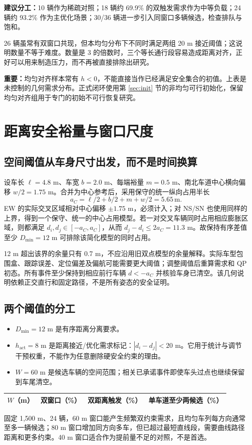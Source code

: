 \documentclass[UTF8,fontset=fandol,11pt,a4paper]{ctexart}
\newcommand{\unit}[1]{\,\mathrm{#1}}\newcommand{\nom}{\mathrm{nom}}
\newcommand{\page}[1]{\clearpage\section{#1}}
\begin{document}
\textbf{建议分工：}10 辆作为稀疏对照；18 辆约 69.9\% 的双触发需求作为中等负载；24 辆约 93.2\% 作为主优化场景；30/36 辆进一步引入同窗口多辆候选，检查排队与饱和。

26 辆虽常有双窗口共现，但本均匀分布下不同时满足两组 20 m 接近阈值；这说明数量不等于难度。数量是 3 的倍数时，三个等长通行段容易造成距离对齐，正好可以用来制造压力，而不再被直接排除出研究。

\textbf{重要：}均匀对齐样本常有 $h<0$，不能直接当作已经满足安全集合的初值。上表是未控制的几何需求分布。正式闭环使用第 \ref{sec:init} 节的非均匀可行初始化，保留均匀对齐组用于专门的初始不可行恢复研究。


\page{距离安全裕量与窗口尺度}
\subsection{空间阈值从车身尺寸出发，而不是时间换算}
设车长 $\ell=4.8$ m、车宽 $b=2.0$ m、每端裕量 $m=0.5$ m、南北车道中心横向偏移 $w/2=1.75$ m。合并为中心参考后，采用保守的统一纵向占用半长
\[
a_C=\ell/2+b/2+m+w/2=5.65\unit{m}.
\]
EW 的实际交叉区域相对中心偏移 $\pm1.75$ m，必须计入；对 NS/SN 也使用同样的上界，得到一个保守、统一的中心占用模型。若一对交叉车辆同时占用相应膨胀区域，则都满足 $d_i,d_j\in[-a_C,a_C]$，从而 $d_j-d_i\leq2a_C=11.3$ m。故保持有序差值至少 $D_{\min}=12$ m 可排除该简化模型的同时占用。

12 m 超出该界的余量只有 0.7 m，不应沿用旧双点模型的余量解释。实际车型包围盒、跟踪误差、定位偏差及偏航可能需要更大阈值；调整阈值后重算需求和 QP 初态。所有事件至少保持到相应前行车辆 $d<-a_C$ 并核验车身已清空。该几何说明依赖正交直行和固定路径，不是所有姿态的安全证明。

\subsection{两个阈值的分工}
\begin{itemize}
\item $D_{\min}=12$ m 是有序距离分离要求。
\item $h_{\mathrm{act}}=8$ m 是距离接近/优化需求标记：$|d_i-d_j|<20$ m。它用于统计与调节干预权重，不能作为任意删除硬安全约束的理由。
\item $W=60$ m 是候选车辆的空间范围；相关已承诺事件即使车头过点也继续保留到车尾清空。
\end{itemize}
\begin{center}\small
\begin{tabular}{rrrr}\toprule
$W$（m） & 双窗口（\%） & 双距离触发（\%） & 单车道至少两候选（\%）\\\midrule

\end{tabular}\end{center}
固定 1,500 m、24 辆，60 m 窗口能产生频繁双约束需求，且均匀车列每方向通常至多一辆候选；80 m 窗口增加同方向多车，但已超过最短直线段，需要曲线路径距离和更多约束。40 m 窗口适合作为提前量不足的对照，不是首选。
\end{document}
